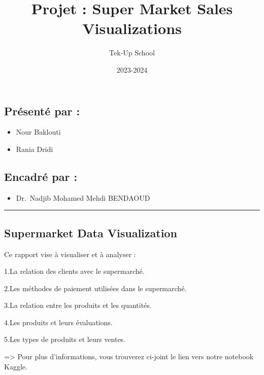 \documentclass[
]{article}
\title{Projet : Super Market Sales Visualizations}
\author{Tek-Up School}
\date{2023-2024}
\providecommand{\tightlist}{%
  \setlength{\itemsep}{0pt}\setlength{\parskip}{0pt}}
\begin{document}
\maketitle

\vspace{4.5cm}

\hypertarget{pruxe9sentuxe9-par}{%
\subsection{Présenté par :}\label{pruxe9sentuxe9-par}}

\begin{itemize}
\tightlist
\item
  Nour Baklouti
\item
  Rania Dridi
\end{itemize}

\vspace{0.5cm}

\hypertarget{encadruxe9-par}{%
\subsection{Encadré par :}\label{encadruxe9-par}}

\begin{itemize}
\tightlist
\item
  Dr.~Nadjib Mohamed Mehdi BENDAOUD
\end{itemize}

\vfill

\begin{center}\rule{0.5\linewidth}{0.5pt}\end{center}

\hypertarget{supermarket-data-visualization}{%
\subsection{Supermarket Data
Visualization}\label{supermarket-data-visualization}}

Ce rapport vise à visualiser et à analyser :

1.La relation des clients avec le supermarché.

2.Les méthodes de paiement utilisées dans le supermarché.

3.La relation entre les produits et les quantités.

4.Les produits et leurs évaluations.

5.Les types de produits et leurs ventes.

=\textgreater{} Pour plus d'informations, vous trouverez ci-joint le
lien vers notre notebook Kaggle.
\end{document}
